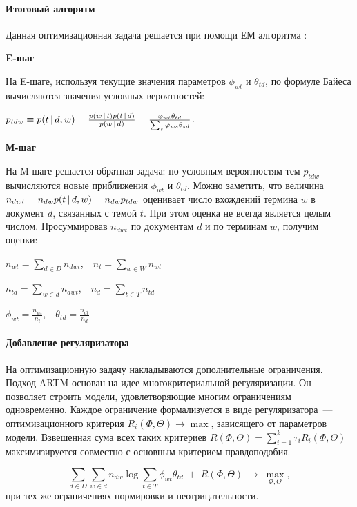 \documentclass[12pt, twoside]{article}
\begin{document}
\paragraph{Итоговый алгоритм}

Данная оптимизационная задача решается при помощи ЕМ алгоритма \cite{hofmann1999probabilistic}:

\noindent\textbf{E-шаг}

На E-шаге, используя текущие значения параметров $\phi_{wt}$ и $\theta_{td}$, по формуле Байеса вычисляются значения условных вероятностей:

$p_{tdw} \equiv p(t \mspace{3mu}{|}\mspace{3mu} d,w) = \frac {p(w \mspace{3mu}{|}\mspace{3mu} t)p(t \mspace{3mu}{|}\mspace{3mu} d)} {p(w \mspace{3mu}{|}\mspace{3mu} d)} = \frac {\varphi_{wt}\theta_{td}} {\sum_s\varphi_{ws}\theta_{sd}}$.

\noindent\textbf{М-шаг}

На M-шаге решается обратная задача: по условным вероятностям тем $p_{tdw}$ вычисляются новые приближения $\phi_{wt}$ и $\theta_{td}$.
Можно заметить, что величина $n_{dwt}=n_{dw}p(t \mspace{3mu}{|}\mspace{3mu} d,w)=n_{dw}p_{tdw}$ оценивает число вхождений термина $w$ в документ $d$, связанных с темой $t$. При этом оценка не всегда является целым числом. Просуммировав $n_{dwt}$ по документам $d$ и по терминам $w$, получим оценки:

$n_{wt}=\sum_{d \in D} n_{dwt}$,~~$n_t = \sum_{w \in W}n_{wt}$

$n_{td}=\sum_{w \in d} n_{dwt}$,~~$n_d = \sum_{t \in T}n_{td}$

$\phi_{wt}=\frac{n_{wt}}{n_t}$,~~$\theta_{td} = \frac{n_{dt}}{n_{d}}$


\paragraph{Добавление регуляризатора}

На оптимизационную задачу накладываются дополнительные ограничения. Подход ARTM \cite{vorontsov2014additive,vorontsov2014tutorial,vorontsov2015additive} основан на идее многокритериальной регуляризации. Он позволяет строить модели, удовлетворяющие многим ограничениям одновременно. Каждое ограничение формализуется в виде регуляризатора~--- оптимизационного критерия $R_i(\Phi,\Theta)\to\max$, зависящего от параметров модели. Взвешенная сума всех таких критериев $R(\Phi,\Theta) = \sum_{i=1}^k \tau_i R_i(\Phi,\Theta)$ максимизируется совместно с основным критерием правдоподобия.

\begin{equation}
\label{artm_optimization}
\sum_{d\in D} \sum_{w\in d} n_{dw}\log \sum_{t\in T} \phi_{wt}\theta_{td} \;+\; R(\Phi,\Theta)\;\to\; \max_{\Phi,\Theta},
\end{equation}
при тех же ограничениях нормировки и неотрицательности.
\end{document}
